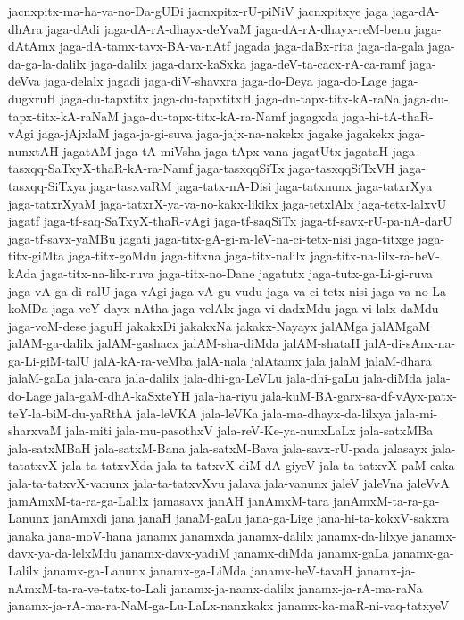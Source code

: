 {jacnxpitx-ma-ha-va-no-Da-gUDi
jacnxpitx-rU-piNiV
jacnxpitxye
jaga
jaga-dA-dhAra
jaga-dAdi
jaga-dA-rA-dhayx-deYvaM
jaga-dA-rA-dhayx-reM-benu
jaga-dAtAmx
jaga-dA-tamx-tavx-BA-va-nAtf
jagada
jaga-daBx-rita
jaga-da-gala
jaga-da-ga-la-dalilx
jaga-dalilx
jaga-darx-kaSxka
jaga-deV-ta-cacx-rA-ca-ramf
jaga-deVva
jaga-delalx
jagadi
jaga-diV-shavxra
jaga-do-Deya
jaga-do-Lage
jaga-dugxruH
jaga-du-tapxtitx
jaga-du-tapxtitxH
jaga-du-tapx-titx-kA-raNa
jaga-du-tapx-titx-kA-raNaM
jaga-du-tapx-titx-kA-ra-Namf
jagagxda
jaga-hi-tA-thaR-vAgi
jaga-jAjxlaM
jaga-ja-gi-suva
jaga-jajx-na-nakekx
jagake
jagakekx
jaga-nunxtAH
jagatAM
jaga-tA-miVsha
jaga-tApx-vana
jagatUtx
jagataH
jaga-tasxqq-SaTxyX-thaR-kA-ra-Namf
jaga-tasxqqSiTx
jaga-tasxqqSiTxVH
jaga-tasxqq-SiTxya
jaga-tasxvaRM
jaga-tatx-nA-Disi
jaga-tatxnunx
jaga-tatxrXya
jaga-tatxrXyaM
jaga-tatxrX-ya-va-no-kakx-likikx
jaga-tetxlAlx
jaga-tetx-lalxvU
jagatf
jaga-tf-saq-SaTxyX-thaR-vAgi
jaga-tf-saqSiTx
jaga-tf-savx-rU-pa-nA-darU
jaga-tf-savx-yaMBu
jagati
jaga-titx-gA-gi-ra-leV-na-ci-tetx-nisi
jaga-titxge
jaga-titx-giMta
jaga-titx-goMdu
jaga-titxna
jaga-titx-nalilx
jaga-titx-na-lilx-ra-beV-kAda
jaga-titx-na-lilx-ruva
jaga-titx-no-Dane
jagatutx
jaga-tutx-ga-Li-gi-ruva
jaga-vA-ga-di-ralU
jaga-vAgi
jaga-vA-gu-vudu
jaga-va-ci-tetx-nisi
jaga-va-no-La-koMDa
jaga-veY-dayx-nAtha
jaga-velAlx
jaga-vi-dadxMdu
jaga-vi-lalx-daMdu
jaga-voM-dese
jaguH
jakakxDi
jakakxNa
jakakx-Nayayx
jalAMga
jalAMgaM
jalAM-ga-dalilx
jalAM-gashacx
jalAM-sha-diMda
jalAM-shataH
jalA-di-sAnx-na-ga-Li-giM-talU
jalA-kA-ra-veMba
jalA-nala
jalAtamx
jala
jalaM
jalaM-dhara
jalaM-gaLa
jala-cara
jala-dalilx
jala-dhi-ga-LeVLu
jala-dhi-gaLu
jala-diMda
jala-do-Lage
jala-gaM-dhA-kaSxteYH
jala-ha-riyu
jala-kuM-BA-garx-sa-df-vAyx-patx-teY-la-biM-du-yaRthA
jala-leVKA
jala-leVKa
jala-ma-dhayx-da-lilxya
jala-mi-sharxvaM
jala-miti
jala-mu-pasothxV
jala-reV-Ke-ya-nunxLaLx
jala-satxMBa
jala-satxMBaH
jala-satxM-Bana
jala-satxM-Bava
jala-savx-rU-pada
jalasayx
jala-tatatxvX
jala-ta-tatxvXda
jala-ta-tatxvX-diM-dA-giyeV
jala-ta-tatxvX-paM-caka
jala-ta-tatxvX-vanunx
jala-ta-tatxvXvu
jalava
jala-vanunx
jaleV
jaleVna
jaleVvA
jamAmxM-ta-ra-ga-Lalilx
jamasavx
janAH
janAmxM-tara
janAmxM-ta-ra-ga-Lanunx
janAmxdi
jana
janaH
janaM-gaLu
jana-ga-Lige
jana-hi-ta-kokxV-sakxra
janaka
jana-moV-hana
janamx
janamxda
janamx-dalilx
janamx-da-lilxye
janamx-davx-ya-da-lelxMdu
janamx-davx-yadiM
janamx-diMda
janamx-gaLa
janamx-ga-Lalilx
janamx-ga-Lanunx
janamx-ga-LiMda
janamx-heV-tavaH
janamx-ja-nAmxM-ta-ra-ve-tatx-to-Lali
janamx-ja-namx-dalilx
janamx-ja-rA-ma-raNa
janamx-ja-rA-ma-ra-NaM-ga-Lu-LaLx-nanxkakx
janamx-ka-maR-ni-vaq-tatxyeV
}

